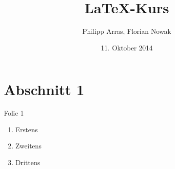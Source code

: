 \documentclass{beamer}
\author{Philipp Arras, Florian Nowak}
\title{\LaTeX -Kurs}
\date{11. Oktober 2014}
\begin{document}
\begin{frame}
\titlepage
\end{frame}

\begin{frame}
\tableofcontents
\end{frame}

\section{Abschnitt 1}
\begin{frame}{Folie 1}
\begin{enumerate}
\item Erstens
\item Zweitens
\item Drittens
\end{enumerate}
\end{frame}
\end{document}
